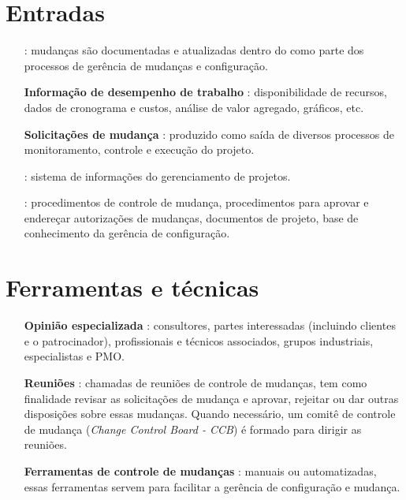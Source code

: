 \section{Entradas}

\begin{itemize}
	
	\item[\textbf{\planproj}]: mudanças são documentadas e atualizadas dentro do \planproj como parte dos processos de gerência de mudanças e configuração.
	
	\item[\textbf{Informação de desempenho de trabalho}]: disponibilidade de recursos, dados de cronograma e custos, análise de valor agregado, gráficos, etc.
	
	\item[\textbf{Solicitações de mudança}]: produzido como saída de diversos processos de monitoramento, controle e execução do projeto.
	
	\item[\textbf{\amb}]: sistema de informações do gerenciamento de projetos. 
	
	\item[\textbf{\ativ}]: procedimentos de controle de mudança, procedimentos para aprovar e endereçar autorizações de mudanças, documentos de projeto, base de conhecimento da gerência de configuração.
	
\end{itemize}

\section{Ferramentas e técnicas}

\begin{itemize}
	
	\item[\textbf{Opinião especializada}]: consultores, partes interessadas (incluindo clientes e o patrocinador), profissionais e técnicos associados, grupos industriais, especialistas e PMO.
	
	\item[\textbf{Reuniões}]: chamadas de reuniões de controle de mudanças, tem como finalidade revisar as solicitações de mudança e aprovar, rejeitar ou dar outras disposições sobre essas mudanças. Quando necessário, um comitê de controle de mudança (\textit{Change Control Board - CCB}) é formado para dirigir as reuniões.
	
	\item[\textbf{Ferramentas de controle de mudanças}]: manuais ou automatizadas, essas ferramentas servem para facilitar a gerência de configuração e mudança.
		
\end{itemize}

